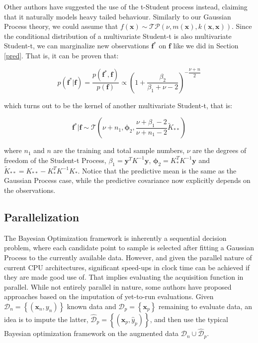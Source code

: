 \documentclass[10pt,a4paper,twoside]{book}
\begin{document}
Other authors \cite{Shah2014} have suggested the use of the t-Student process instead, claiming that it naturally models heavy tailed behaviour. Similarly to our Gaussian Process theory, we could assume  that $f(\boldsymbol{x}) \sim \mathcal{TP}\left(\nu, m(\boldsymbol{x}), k(\boldsymbol{x}, \boldsymbol{x})\right)$. Since the conditional distribution of a multivariate Student-t is also multivariate Student-t, we can marginalize new observations $\boldsymbol{f}^*$ on $\boldsymbol{f}$ like we did in Section \ref{pred}. That is, it can be proven that:

\begin{equation}
p(\boldsymbol{f}^*|\boldsymbol{f}) = \dfrac{p(\boldsymbol{f}^*,\boldsymbol{f})}{p(\boldsymbol{f})} \propto \left( 1 + \frac{\beta_2}{\beta_1 + \nu - 2} \right)^{-\dfrac{\nu + n}{2}}
\end{equation}

which turns out to be the kernel of another multivariate Student-t, that is:

\begin{equation}
\boldsymbol{f}^*|\boldsymbol{f} \sim \mathcal{T}\left(\nu + n_1, \boldsymbol{\phi}_2, \dfrac{\nu + \beta_1 - 2}{\nu + n_1 - 2} \tilde{K}_{**} \right)
\end{equation}

where $n_1$ and $n$ are the training and total sample numbers, $\nu$ are the degrees of freedom of the Student-t Process, $\beta_1 = \boldsymbol{y}^{T}K^{-1}\boldsymbol{y}$, $\boldsymbol{\phi}_2 = K_{*}^T K^{-1}\boldsymbol{y}$ and $\tilde{K}_{**} = K_{**} - K_{*}^T K^{-1}K_{*}$. Notice that the predictive mean is the same as the Gaussian Process case, while the predictive covariance now explicitly depends on the observations.

\subsection{Parallelization}

The Bayesian Optimization framework is inherently a sequential decision problem, where each candidate point to sample is selected after fitting a Gaussian Process to the currently available data. However, and given the parallel nature of current CPU architectures, significant speed-ups in clock time can be achieved if they are made good use of. That implies evaluating the acquisition function in parallel. While not entirely parallel in nature, some authors have proposed approaches based on the imputation of yet-to-run evaluations. Given $\mathcal{D}_n = \left\lbrace (\boldsymbol{x}_n, y_n) \right\rbrace$ known data and $\mathcal{D}_p = \left\lbrace \boldsymbol{x}_p \right\rbrace$ remaining to evaluate data, an idea is to impute the latter, $\hat{\mathcal{D}}_p = \left\lbrace (\boldsymbol{x}_p, \hat{y}_p) \right\rbrace$, and then use the typical Bayesian optimization framework on the augmented data $\mathcal{D}_n \cup \hat{\mathcal{D}}_p$.\\
\end{document}
